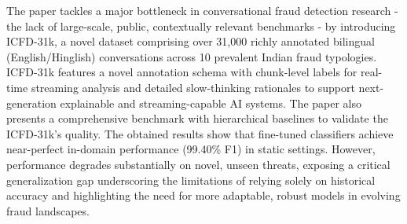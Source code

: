 \documentclass{article}
\begin{document}

The paper tackles a major bottleneck in conversational fraud detection research - the lack of large-scale, public, contextually relevant benchmarks - by introducing ICFD-31k, a novel dataset comprising over 31,000 richly annotated bilingual (English/Hinglish) conversations across 10 prevalent Indian fraud typologies. ICFD-31k features a novel annotation schema with chunk-level labels for real-time streaming analysis and detailed slow-thinking rationales to support next-generation explainable and streaming-capable AI systems. The paper also presents a comprehensive benchmark with hierarchical baselines to validate the ICFD-31k's quality. The obtained results show that fine-tuned classifiers achieve near-perfect in-domain performance (99.40\% F1) in static settings. However, performance degrades substantially on novel, unseen threats, exposing a critical generalization gap underscoring the limitations of relying solely on historical accuracy and highlighting the need for more adaptable, robust models in evolving fraud landscapes.
\label{sec:conclusion}
\end{document}
